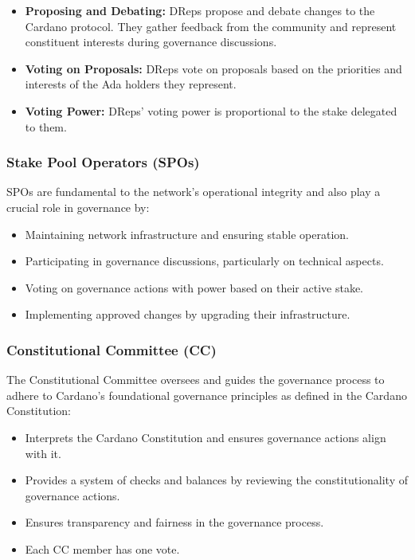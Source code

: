 \begin{itemize}
    \item \textbf{Proposing and Debating:} DReps propose and debate changes to the Cardano protocol. They gather feedback from the community and represent constituent interests during governance discussions.
    \item \textbf{Voting on Proposals:} DReps vote on proposals based on the priorities and interests of the Ada holders they represent.
    \item \textbf{Voting Power:} DReps' voting power is proportional to the stake delegated to them.
\end{itemize}

\subsubsection{Stake Pool Operators (SPOs)}
SPOs are fundamental to the network's operational integrity and also play a crucial role in governance by:

\begin{itemize}
    \item Maintaining network infrastructure and ensuring stable operation.
    \item Participating in governance discussions, particularly on technical aspects.
    \item Voting on governance actions with power based on their active stake.
    \item Implementing approved changes by upgrading their infrastructure.
\end{itemize}

\subsubsection{Constitutional Committee (CC)}
The Constitutional Committee oversees and guides the governance process to adhere to Cardano's foundational governance principles as defined in the Cardano Constitution:

\begin{itemize}
    \item Interprets the Cardano Constitution and ensures governance actions align with it.
    \item Provides a system of checks and balances by reviewing the constitutionality of governance actions.
    \item Ensures transparency and fairness in the governance process.
    \item Each CC member has one vote.
\end{itemize}


